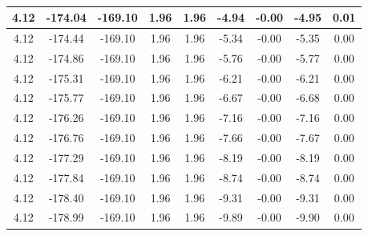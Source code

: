 \begin{table}[htbp]
\begin{adjustbox}{angle=90}
\begin{tabular}{|c|c|c|c|c|c|c|c|c|}
 4.12 & -174.04 & -169.10 & 1.96 & 1.96 & -4.94 & -0.00 & -4.95 & 0.01\\ \hline
 4.12 & -174.44 & -169.10 & 1.96 & 1.96 & -5.34 & -0.00 & -5.35 & 0.00\\ \hline
 4.12 & -174.86 & -169.10 & 1.96 & 1.96 & -5.76 & -0.00 & -5.77 & 0.00\\ \hline
 4.12 & -175.31 & -169.10 & 1.96 & 1.96 & -6.21 & -0.00 & -6.21 & 0.00\\ \hline
 4.12 & -175.77 & -169.10 & 1.96 & 1.96 & -6.67 & -0.00 & -6.68 & 0.00\\ \hline
 4.12 & -176.26 & -169.10 & 1.96 & 1.96 & -7.16 & -0.00 & -7.16 & 0.00\\ \hline
 4.12 & -176.76 & -169.10 & 1.96 & 1.96 & -7.66 & -0.00 & -7.67 & 0.00\\ \hline
 4.12 & -177.29 & -169.10 & 1.96 & 1.96 & -8.19 & -0.00 & -8.19 & 0.00\\ \hline
 4.12 & -177.84 & -169.10 & 1.96 & 1.96 & -8.74 & -0.00 & -8.74 & 0.00\\ \hline
 4.12 & -178.40 & -169.10 & 1.96 & 1.96 & -9.31 & -0.00 & -9.31 & 0.00\\ \hline
 4.12 & -178.99 & -169.10 & 1.96 & 1.96 & -9.89 & -0.00 & -9.90 & 0.00\\ \hline
            \end{tabular}
        \end{adjustbox}
        \caption{}
        \label{}
    \end{table}
    
